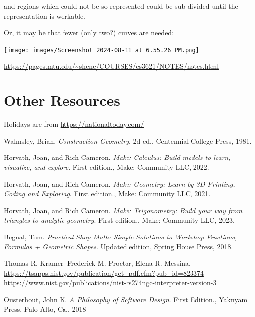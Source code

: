 \documentclass{ltxdoc}
\begin{document}
\noindent and regions which could not be so represented could be sub-divided until the 
representation is workable.

Or, it may be that fewer (only two?) curves are needed:

\noindent\texttt{[image: images/Screenshot 2024-08-11 at 6.55.26 PM.png]}

\url{https://pages.mtu.edu/~shene/COURSES/cs3621/NOTES/notes.html}

\section{Other Resources}
 
Holidays are from \url{https://nationaltoday.com/}

 



\begin{thebibliography}{Ousterhout2018APO}

Walmsley, Brian. \emph{Construction Geometry}. 2d ed., Centennial College Press, 1981.
 
Horvath, Joan, and Rich Cameron. 
\emph{Make: Calculus: Build models to learn, visualize, and explore}. First edition., 
Make: Community LLC, 2022.
 
Horvath, Joan, and Rich Cameron. 
\emph{Make: Geometry: Learn by 3D Printing, Coding and Exploring}. First edition., 
Make: Community LLC, 2021.

Horvath, Joan, and Rich Cameron. 
\emph{Make: Trigonometry: Build your way from triangles to analytic geometry}. First edition., 
Make: Community LLC, 2023.
 
Begnal, Tom. \emph{Practical Shop Math: Simple Solutions to Workshop Fractions, Formulas + Geometric Shapes}. Updated edition, Spring House Press, 2018.
 
Thomas R. Kramer, Frederick M. Proctor, Elena R. Messina.\\
\mbox{\url{https://tsapps.nist.gov/publication/get_pdf.cfm?pub_id=823374}}\\
\url{https://www.nist.gov/publications/nist-rs274ngc-interpreter-version-3}

Ousterhout, John K.
\emph{A Philosophy of Software Design}. First Edition., Yaknyam Press, Palo Alto, Ca., 2018



\end{thebibliography}

\createindexes

 
\end{document}
